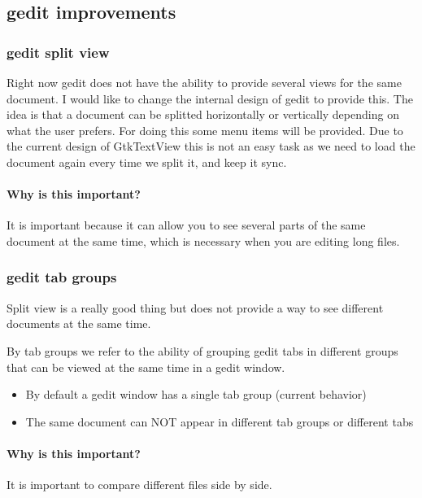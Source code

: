 \subsection*{gedit improvements}

\subsubsection*{gedit split view}

Right now gedit does not have the ability to provide several views for the same document. I would like to change the internal design of gedit to provide this. The idea is that a document can be splitted horizontally or vertically depending on what the user prefers. For doing this some menu items will be provided.
Due to the current design of GtkTextView this is not an easy task as we need to load the document again every time we split it, and keep it sync.

\paragraph{Why is this important?}

It is important because it can allow you to see several parts of the same document at the same time, which is necessary when you are editing long files.

\subsubsection*{gedit tab groups}

Split view is a really good thing but does not provide a way to see different documents at the same time.

By tab groups we refer to the ability of grouping gedit tabs in different groups that can be viewed at the same time in a gedit window.
\begin{itemize}
  \item By default a gedit window has a single tab group (current behavior)
  \item The same document can NOT appear in different tab groups or different tabs
\end{itemize}

\paragraph{Why is this important?}

It is important to compare different files side by side.

